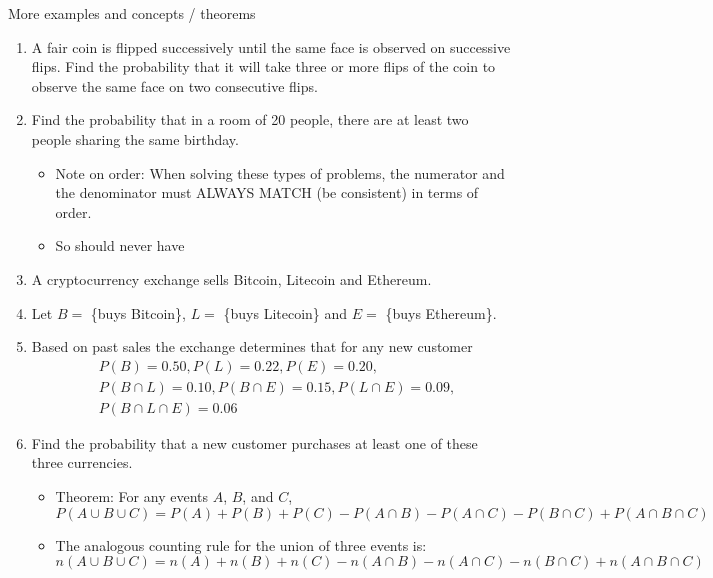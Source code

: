 \documentclass{article}
\begin{document}
More examples and concepts / theorems\bigskip
\begin{enumerate}
    \item A fair coin is flipped successively until the same face is observed on successive flips. Find the probability that it will take three or more flips of the coin to observe the same face on two consecutive flips.\vspace{150pt}
    \item Find the probability that in a room of 20 people, there are at least two people sharing the same birthday.\vspace{100pt}
    \begin{itemize}
        \item Note on order: When solving these types of problems, the numerator and the denominator must ALWAYS MATCH (be consistent) in terms of order.
        \item[] So should never have \vspace{20pt}
    \end{itemize}
    \item A cryptocurrency exchange sells Bitcoin, Litecoin and Ethereum.
    \item[] Let $B = $ \{buys Bitcoin\}, $L = $ \{buys Litecoin\} and $E = $ \{buys Ethereum\}.
    \item[] Based on past sales the exchange determines that for any new customer
    \begin{align*}
     & P(B) = 0.50, P(L) = 0.22, P(E) = 0.20, \\
     & P(B \cap L) = 0.10, P(B \cap E) = 0.15, P(L \cap E) = 0.09, \\
     & P(B \cap L \cap E) = 0.06
    \end{align*}
    \item[] Find the probability that a new customer purchases at least one of these three currencies.\vspace{100pt}
    \begin{itemize}
        \item Theorem: For any events $A$, $B$, and $C$,
        \[P(A \cup B \cup C) = P(A) + P(B) + P(C) - P(A \cap B) - P(A \cap C) - P(B \cap C) + P(A \cap B \cap C)\]
        \item[] The analogous counting rule for the union of three events is: \[n(A \cup B \cup C) = n(A) + n(B) + n(C) - n(A \cap B) - n(A \cap C) - n(B \cap C) + n(A \cap B \cap C)\]
    \end{itemize}
\end{enumerate}\bigskip
\end{document}
